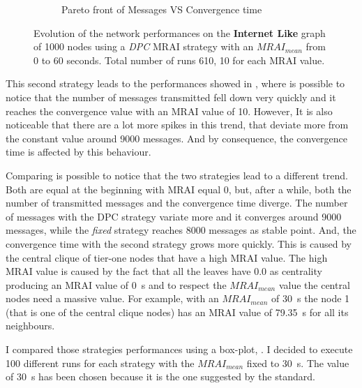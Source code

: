 \begin{figure}[h]
\begin{subfigure}[b]{0.477\textwidth}
		 \caption{Pareto front of Messages VS Convergence time}
         \label{fig:internt_like_1000_DPC_evolution_paretoFront}
     \end{subfigure}
		\caption{Evolution of the network performances on the \textbf{Internet Like} graph
			of \num{1000} nodes using a \textit{DPC} \ac{MRAI} strategy
			with an $MRAI_{mean}$ from \num{0} to \num{60} seconds. Total number
			of runs \num{610}, \num{10} for each \ac{MRAI} value.}
        \label{fig:internet_like_1000_dpc_evolution}
\end{figure}

This second strategy leads to the performances showed in ,
where is possible to notice that the number of messages transmitted fell down
very quickly and it reaches the convergence value with an \ac{MRAI} value of
\num{10}.
However, It is also noticeable that there are a lot more spikes in this trend, that
deviate more from the constant value around \num{9000} messages.
And by consequence, the convergence time is affected by this behaviour.

Comparing 
is possible to notice that the two strategies lead to a different trend.
Both are equal at the beginning with \ac{MRAI} equal \num{0}, but, after a while,
both the number of transmitted messages and the convergence time diverge.
The number of messages with the \ac{DPC} strategy variate more and it converges
around \num{9000} messages, while the \textit{fixed} strategy reaches \num{8000}
messages as stable point.
And, the convergence time with the second strategy grows more quickly.
This is caused by the central clique of tier-one nodes that have a high \ac{MRAI}
value.
The high \ac{MRAI} value is caused by the fact that all the leaves have \num{0.0}
as centrality producing an \ac{MRAI} value of \SI{0}{\second} and to respect
the $MRAI_{mean}$ value the central nodes need a massive value.
For example, with an $MRAI_{mean}$ of \SI{30}{\second} the node \num{1} (that is
one of the central clique nodes) has an \ac{MRAI} value of \SI{79.35}{\second} for all its
neighbours.

I compared those strategies performances using a box-plot, .
I decided to execute \num{100} different runs for each strategy with the $MRAI_{mean}$
fixed to \SI{30}{\second}.
The value of \SI{30}{\second} has been chosen because it is the one suggested by the standard.

